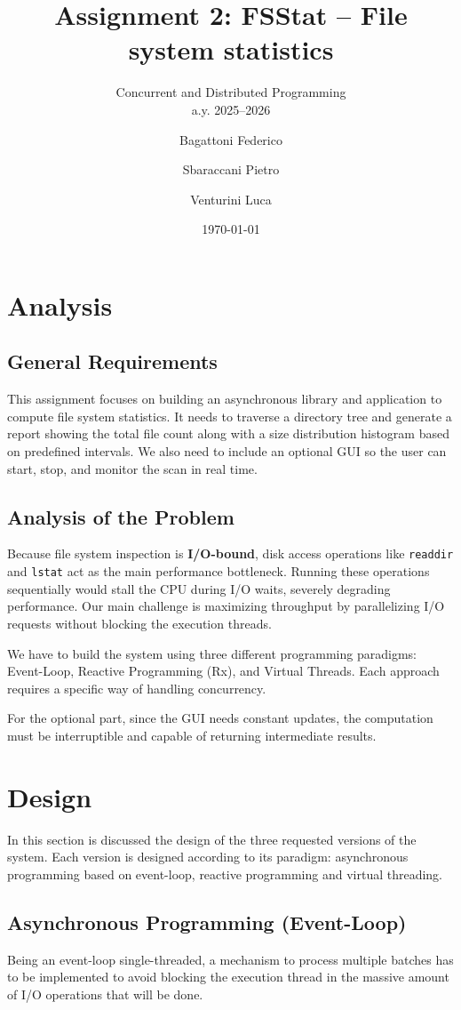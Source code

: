 \documentclass{scrartcl}
\title{\LARGE Assignment 2: FSStat -- File system statistics}
\subtitle{Concurrent and Distributed Programming\\a.y. 2025--2026}
\author{
  Bagattoni Federico \and Sbaraccani Pietro \and Venturini Luca
}
\date{\today}
\begin{document}
\maketitle

\section{Analysis}

\subsection{General Requirements}
This assignment focuses on building an asynchronous library and application to compute file system statistics. It needs to traverse a directory tree and generate a report showing the total file count along with a size distribution histogram based on predefined intervals.
We also need to include an optional GUI so the user can start, stop, and monitor the scan in real time.

\subsection{Analysis of the Problem}
Because file system inspection is \textbf{I/O-bound}, disk access operations like \texttt{readdir} and \texttt{lstat} act as the main performance bottleneck.
Running these operations sequentially would stall the CPU during I/O waits, severely degrading performance. Our main challenge is maximizing throughput by parallelizing I/O requests without blocking the execution threads.

We have to build the system using three different programming paradigms: Event-Loop, Reactive Programming (Rx), and Virtual Threads. Each approach requires a specific way of handling concurrency. 

For the optional part, since the GUI needs constant updates, the computation must be interruptible and capable of returning intermediate results.

\section{Design}
In this section is discussed the design of the three requested versions of the system. Each version is designed according to its paradigm: asynchronous programming based on event-loop, reactive programming and virtual threading.
\subsection{Asynchronous Programming (Event-Loop)}\label{sec:des-async}
Being an event-loop single-threaded, a mechanism to process multiple batches has to be implemented to avoid blocking the execution thread in
the massive amount of I/O operations that will be done. 
\end{document}
